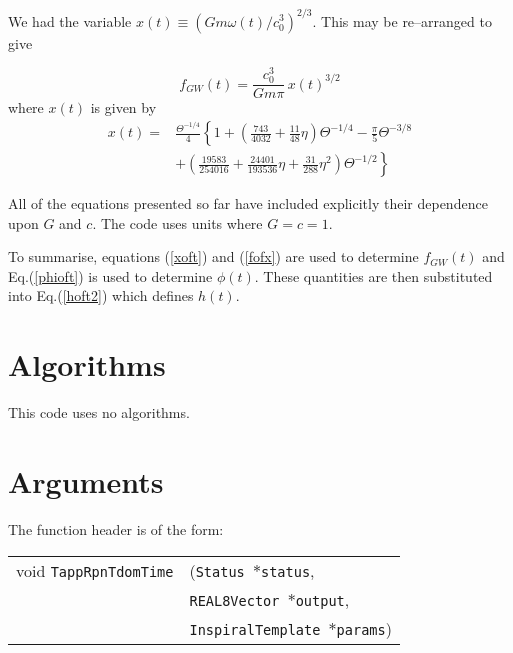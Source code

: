 \documentclass[12pt]{article}
\begin{document}
We had the variable $x(t) \equiv (Gm \omega(t)/c^{3}_{0})^{2/3}$. This may be re--arranged to give

\begin{equation}
f_{GW}(t) = \frac{c^{3}_{0}}{G m \pi} \, x(t)^{3/2}
\label{fofx}
\end{equation}
where $x(t)$ is given by
\begin{equation}
\begin{split}
x(t) =  &  \frac{\Theta^{-1/4}}{4} \left\{  1 + \left(\frac{743}{4032} + \frac{11}{48} \eta \right) \Theta^{-1/4} - \frac{\pi}{5} \Theta^{-3/8} \right. \\
     &  + \left. \left( \frac{19583}{254016} + \frac{24401}{193536} \eta + \frac{31}{288} \eta^{2} \right) \Theta^{-1/2} \right\}
\end{split}
\label{xoft}
\end{equation}

All of the equations presented so far have included explicitly their dependence upon $G$ and $c$. The code uses units where $G=c=1$.

To summarise, equations (\ref{xoft}) and (\ref{fofx}) are used to determine $f_{GW}(t)$ and Eq.(\ref{phioft}) is used to determine $\phi(t)$. These quantities are then substituted into Eq.(\ref{hoft2}) which defines $h(t)$.

\section{Algorithms}

This code uses no algorithms.


\section{Arguments}

The function header is of the form:

\vspace{5mm}

\begin{tabular}{ll}
void \texttt{TappRpnTdomTime}&(\texttt{Status $\ast$status},     \\
                                   &\texttt{REAL8Vector $\ast$output}, \\
                                   &\texttt{InspiralTemplate $\ast$params})
\end{tabular}

\vspace{5mm}
\end{document}
